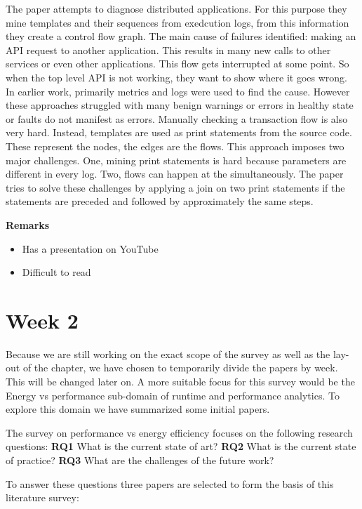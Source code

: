\documentclass[]{book}
\providecommand{\tightlist}{%
  \setlength{\itemsep}{0pt}\setlength{\parskip}{0pt}}
\begin{document}
The paper attempts to diagnose distributed applications. For this
purpose they mine templates and their sequences from exedcution logs,
from this information they create a control flow graph. The main cause
of failures identified: making an API request to another application.
This results in many new calls to other services or even other
applications. This flow gets interrupted at some point. So when the top
level API is not working, they want to show where it goes wrong. In
earlier work, primarily metrics and logs were used to find the cause.
However these approaches struggled with many benign warnings or errors
in healthy state or faults do not manifest as errors. Manually checking
a transaction flow is also very hard. Instead, templates are used as
print statements from the source code. These represent the nodes, the
edges are the flows. This approach imposes two major challenges. One,
mining print statements is hard because parameters are different in
every log. Two, flows can happen at the simultaneously. The paper tries
to solve these challenges by applying a join on two print statements if
the statements are preceded and followed by approximately the same
steps.

\textbf{Remarks}

\begin{itemize}
\tightlist
\item
  Has a presentation on YouTube
\item
  Difficult to read
\end{itemize}

\section{Week 2}\label{week-2}

Because we are still working on the exact scope of the survey as well as
the lay-out of the chapter, we have chosen to temporarily divide the
papers by week. This will be changed later on. A more suitable focus for
this survey would be the Energy vs performance sub-domain of runtime and
performance analytics. To explore this domain we have summarized some
initial papers.

The survey on performance vs energy efficiency focuses on the following
research questions: \textbf{RQ1} What is the current state of art?
\textbf{RQ2} What is the current state of practice? \textbf{RQ3} What
are the challenges of the future work?

To answer these questions three papers are selected to form the basis of
this literature survey:
\end{document}

